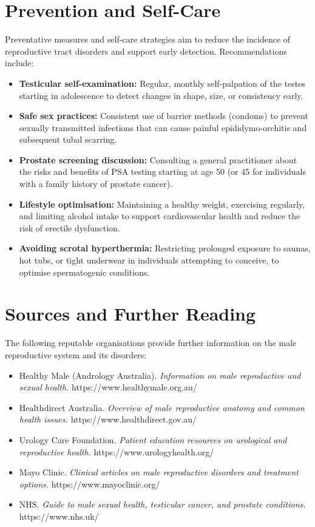 \section*{Prevention and Self-Care}
Preventative measures and self-care strategies aim to reduce the incidence of reproductive tract disorders and support early detection. Recommendations include:
\begin{itemize}
    \item \textbf{Testicular self-examination:} Regular, monthly self-palpation of the testes starting in adolescence to detect changes in shape, size, or consistency early.
    \item \textbf{Safe sex practices:} Consistent use of barrier methods (condoms) to prevent sexually transmitted infections that can cause painful epididymo-orchitis and subsequent tubal scarring.
    \item \textbf{Prostate screening discussion:} Consulting a general practitioner about the risks and benefits of PSA testing starting at age 50 (or 45 for individuals with a family history of prostate cancer).
    \item \textbf{Lifestyle optimisation:} Maintaining a healthy weight, exercising regularly, and limiting alcohol intake to support cardiovascular health and reduce the risk of erectile dysfunction.
    \item \textbf{Avoiding scrotal hyperthermia:} Restricting prolonged exposure to saunas, hot tubs, or tight underwear in individuals attempting to conceive, to optimise spermatogenic conditions.
\end{itemize}

\section*{Sources and Further Reading}
The following reputable organisations provide further information on the male reproductive system and its disorders:
\begin{itemize}
    \item Healthy Male (Andrology Australia). \textit{Information on male reproductive and sexual health.} https://www.healthymale.org.au/
    \item Healthdirect Australia. \textit{Overview of male reproductive anatomy and common health issues.} https://www.healthdirect.gov.au/
    \item Urology Care Foundation. \textit{Patient education resources on urological and reproductive health.} https://www.urologyhealth.org/
    \item Mayo Clinic. \textit{Clinical articles on male reproductive disorders and treatment options.} https://www.mayoclinic.org/
    \item NHS. \textit{Guide to male sexual health, testicular cancer, and prostate conditions.} https://www.nhs.uk/
\end{itemize}
